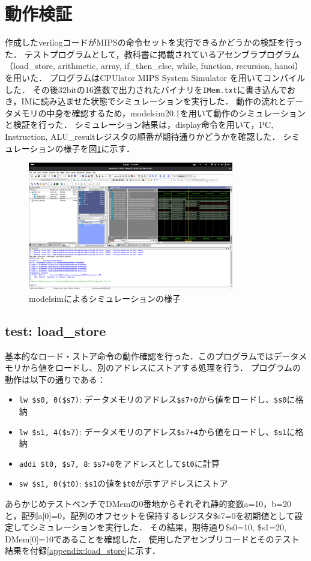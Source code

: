 \documentclass[dvipdfmx]{jsarticle}
\begin{document}
\section{動作検証}
作成したverilogコードがMIPSの命令セットを実行できるかどうかの検証を行った．
テストプログラムとして，教科書\cite{textbook}に掲載されているアセンブラプログラム（load\_store, arithmetic, array, if\_then\_else, while, function, recursion, hanoi）を用いた．
プログラムはCPUlator MIPS System Simulator \cite{mips-sim}を用いてコンパイルした．
その後32bitの16進数で出力されたバイナリを\texttt{IMem.txt}に書き込んでおき，IMに読み込ませた状態でシミュレーションを実行した．
動作の流れとデータメモリの中身を確認するため，modelsim20.1を用いて動作のシミュレーションと検証を行った．
シミュレーション結果は，display命令を用いて，PC, Instruction, ALU\_resultレジスタの順番が期待通りかどうかを確認した．
シミュレーションの様子を図\ref{fig:simulation}に示す．
\begin{figure}[h]
\centering
  \includegraphics[width=0.8\textwidth]{modelsim.png}
  \caption{modelsimによるシミュレーションの様子}
  \label{fig:simulation}
\end{figure}

\subsection{test: load\_store}
基本的なロード・ストア命令の動作確認を行った．このプログラムではデータメモリから値をロードし、別のアドレスにストアする処理を行う．
プログラムの動作は以下の通りである：
\begin{itemize}
\item \texttt{lw \$s0, 0(\$s7)}: データメモリのアドレス\texttt{\$s7+0}から値をロードし、\texttt{\$s0}に格納
\item \texttt{lw \$s1, 4(\$s7)}: データメモリのアドレス\texttt{\$s7+4}から値をロードし、\texttt{\$s1}に格納  
\item \texttt{addi \$t0, \$s7, 8}: \texttt{\$s7+8}をアドレスとして\texttt{\$t0}に計算
\item \texttt{sw \$s1, 0(\$t0)}: \texttt{\$s1}の値を\texttt{\$t0}が示すアドレスにストア
\end{itemize}
あらかじめテストベンチでDMemの0番地からそれぞれ静的変数a=10，b=20と，配列a[0]=0，配列のオフセットを保持するレジスタ\$s7=0を初期値として設定してシミュレーションを実行した．
その結果，期待通り\$s0=10, \$s1=20, DMem[0]=10であることを確認した．
使用したアセンブリコードとそのテスト結果を付録\ref{appendix:load_store}に示す．
\end{document}
